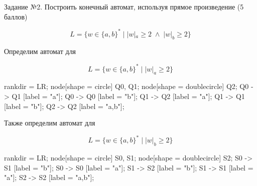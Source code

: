 \documentclass[fleqn]{article}
\begin{document}
\begin{large}
Задание №2. Построить конечный автомат, используя прямое произведение (5 баллов) 
\end{large}

\begin{equation}
    L = \{w \in \{ a,b \}^* \; | \; |w|_a \geq 2 \; \wedge \; |w|_b \geq 2 \}
\end{equation}

Определим автомат для

\begin{equation}
    L = \{w \in \{ a,b \}^* \; | \; |w|_a \geq 2 \}
\end{equation}

 {
    rankdir = LR;
    node[shape = circle] Q0, Q1;
    node[shape = doublecircle] Q2;
    Q0 -> Q1 [label = "a"];
    Q0 -> Q0 [label = "b"];
    Q1 -> Q2 [label = "a"];
    Q1 -> Q1 [label = "b"];
    Q2 -> Q2 [label = "a,b"];
}

Также определим автомат для

\begin{equation}
    L = \{w \in \{ a,b \}^* \; | \; |w|_b \geq 2 \}
\end{equation}

 {
    rankdir = LR;
    node[shape = circle] S0, S1;
    node[shape = doublecircle] S2;
    S0 -> S1 [label = "b"];
    S0 -> S0 [label = "a"];
    S1 -> S2 [label = "b"];
    S1 -> S1 [label = "a"];
    S2 -> S2 [label = "a,b"];
    
}
\end{document}
